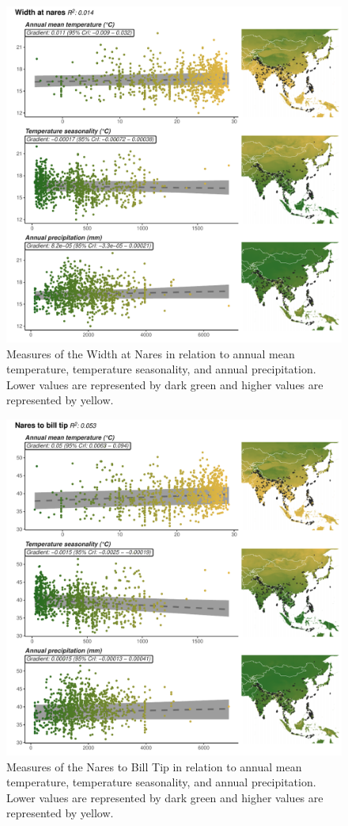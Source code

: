 \documentclass[10pt,a4paper]{article}
\begin{document}
\begin{figure}
\includegraphics[width=0.9\linewidth]{../Figures/climMap_Width.at.nares} \caption{Measures of the Width at Nares in relation to annual mean temperature, temperature seasonality, and annual precipitation. Lower values are represented by dark green and higher values are represented by yellow.}\label{fig:climateComparisonMapWN}
\end{figure}

\begin{figure}
\includegraphics[width=0.9\linewidth]{../Figures/climMap_Nares.to.bill.tip} \caption{Measures of the Nares to Bill Tip in relation to annual mean temperature, temperature seasonality, and annual precipitation. Lower values are represented by dark green and higher values are represented by yellow.}\label{fig:climateComparisonMapNtBT}
\end{figure}
\end{document}
